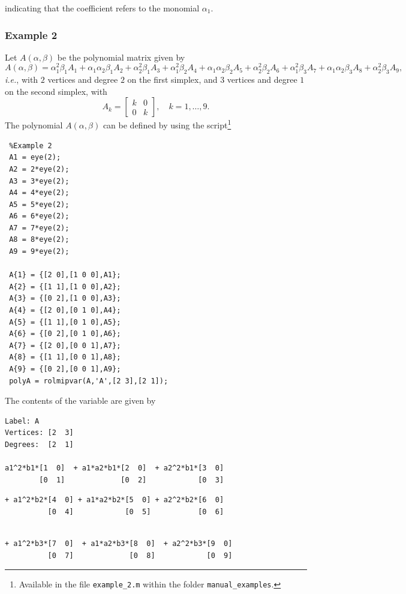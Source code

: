 \documentclass[english,11pt]{article}
\theoremstyle{break} \theorembodyfont{\small\rm}
\begin{document}
indicating that the coefficient  refers to the monomial $\alpha_1$.
\vspace{0.2cm}





\subsubsection*{Example 2}
Let $A(\alpha,\beta)$ be the polynomial matrix given by
\[
A(\alpha,\beta) = \alpha_1^2\beta_1 A_1 + \alpha_1\alpha_2\beta_1 A_2 + \alpha_2^2\beta_1 A_3 +
\alpha_1^2\beta_2 A_4 + \alpha_1\alpha_2\beta_2 A_5 + \alpha_2^2\beta_2 A_6 +
\alpha_1^2\beta_3 A_7 + \alpha_1\alpha_2\beta_3 A_8 + \alpha_2^2\beta_3 A_9,
\]
\textit{i.e.}, with $2$ vertices and degree $2$ on the first simplex, and $3$ vertices
and degree $1$ on the second simplex, with
\[
 A_k = \begin{bmatrix} k & 0 \\ 0 & k \end{bmatrix}, \quad k = 1, \ldots, 9.
\]
The polynomial $A(\alpha,\beta)$
can be defined by using the script\footnote{Available in the file \texttt{example\_2.m} within the folder \texttt{manual\_examples}.}

\begin{minipage}{9.5cm}
\begin{lstlisting}
 %Example 2
 A1 = eye(2);
 A2 = 2*eye(2);
 A3 = 3*eye(2);
 A4 = 4*eye(2);
 A5 = 5*eye(2);
 A6 = 6*eye(2);
 A7 = 7*eye(2);
 A8 = 8*eye(2);
 A9 = 9*eye(2);

 A{1} = {[2 0],[1 0 0],A1};
 A{2} = {[1 1],[1 0 0],A2};
 A{3} = {[0 2],[1 0 0],A3};
 A{4} = {[2 0],[0 1 0],A4};
 A{5} = {[1 1],[0 1 0],A5};
 A{6} = {[0 2],[0 1 0],A6};
 A{7} = {[2 0],[0 0 1],A7};
 A{8} = {[1 1],[0 0 1],A8};
 A{9} = {[0 2],[0 0 1],A9};
 polyA = rolmipvar(A,'A',[2 3],[2 1]);
\end{lstlisting}
\end{minipage}

The contents of the variable  are given by

\begin{minipage}{13.0cm}
\begin{lstlisting}[rulecolor=\color{red}]
Label: A
Vertices: [2  3]
Degrees:  [2  1]

a1^2*b1*[1  0]  + a1*a2*b1*[2  0]  + a2^2*b1*[3  0]
        [0  1]             [0  2]            [0  3]

\end{lstlisting}
\begin{lstlisting}[style=ManualCode,aboveskip=0pt,belowskip=0pt]
+ a1^2*b2*[4  0] + a1*a2*b2*[5  0] + a2^2*b2*[6  0]
          [0  4]            [0  5]           [0  6]
\end{lstlisting}
\begin{lstlisting}[rulecolor=\color{red},aboveskip=0pt]

+ a1^2*b3*[7  0]  + a1*a2*b3*[8  0]  + a2^2*b3*[9  0]
          [0  7]             [0  8]            [0  9]

\end{lstlisting}
\end{minipage}
\end{document}

